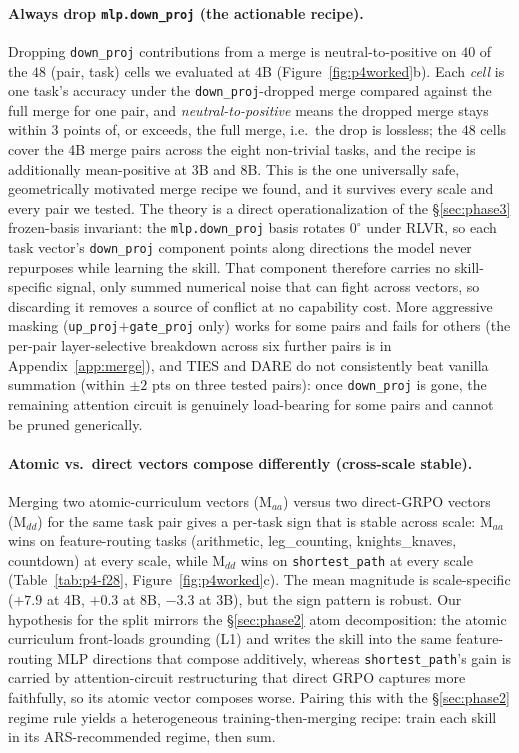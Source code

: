 \documentclass{article}
\newcommand{\dg}{^{\circ}}
\begin{document}
\paragraph{Always drop \texttt{mlp.down\_proj} (the actionable recipe).} Dropping
\texttt{down\_proj} contributions from a merge is neutral-to-positive on $40$ of the $48$
(pair, task) cells we evaluated at 4B (Figure~\ref{fig:p4worked}b). Each \emph{cell} is one task's
accuracy under the \texttt{down\_proj}-dropped merge compared against the full merge for one pair,
and \emph{neutral-to-positive} means the dropped merge stays within $3$ points of, or exceeds, the
full merge, i.e.\ the drop is lossless; the $48$ cells cover the 4B merge pairs across the eight
non-trivial tasks, and the recipe is additionally mean-positive at 3B and 8B. This is the one
universally safe, geometrically motivated merge recipe we found, and it survives every scale and
every pair we tested. The theory is a direct operationalization of the \S\ref{sec:phase3}
frozen-basis invariant: the \texttt{mlp.down\_proj} basis rotates $0\dg$ under RLVR, so each task
vector's \texttt{down\_proj} component points along directions the model never repurposes while
learning the skill. That component therefore carries no skill-specific signal, only summed
numerical noise that can fight across vectors, so discarding it removes a source of conflict at no
capability cost. More aggressive masking (\texttt{up\_proj}$+$\texttt{gate\_proj} only) works for
some pairs and fails for others (the per-pair layer-selective breakdown across six further pairs is
in Appendix~\ref{app:merge}), and TIES and DARE \citep{yadav2023ties,yu2024dare} do not
consistently beat vanilla summation (within $\pm 2$ pts on three tested pairs): once
\texttt{down\_proj} is gone, the remaining attention circuit is genuinely load-bearing for some
pairs and cannot be pruned generically.

\paragraph{Atomic vs.\ direct vectors compose differently (cross-scale stable).} Merging two
atomic-curriculum vectors (M$_{aa}$) versus two direct-GRPO vectors (M$_{dd}$) for the same task
pair gives a per-task sign that is stable across scale: M$_{aa}$ wins on feature-routing tasks
(arithmetic, leg\_counting, knights\_knaves, countdown) at every scale, while M$_{dd}$ wins on
\texttt{shortest\_path} at every scale (Table~\ref{tab:p4-f28}, Figure~\ref{fig:p4worked}c). The
mean magnitude is scale-specific ($+7.9$ at 4B, $+0.3$ at 8B, $-3.3$ at 3B), but the sign pattern
is robust. Our
hypothesis for the split mirrors the \S\ref{sec:phase2} atom decomposition: the atomic curriculum
front-loads grounding (L1) and writes the skill into the same feature-routing MLP directions that
compose additively, whereas \texttt{shortest\_path}'s gain is carried by attention-circuit
restructuring that direct GRPO captures more faithfully, so its atomic vector composes worse.
Pairing this with the \S\ref{sec:phase2} regime rule yields a heterogeneous training-then-merging
recipe: train each skill in its ARS-recommended regime, then sum.
\end{document}
